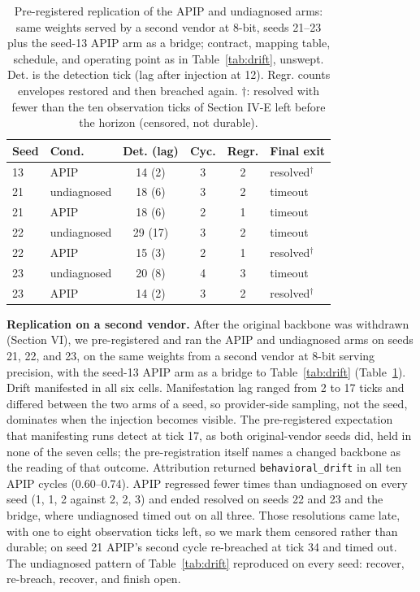\documentclass[conference]{IEEEtran}
\begin{document}
\begin{table}[!t]
\caption{Pre-registered replication of the APIP and undiagnosed arms: same weights served by a second vendor at 8-bit, seeds 21--23 plus the seed-13 APIP arm as a bridge; contract, mapping table, schedule, and operating point as in Table~\ref{tab:drift}, unswept. Det. is the detection tick (lag after injection at 12). Regr. counts envelopes restored and then breached again. $\dagger$: resolved with fewer than the ten observation ticks of Section IV-E left before the horizon (censored, not durable).}
\label{tab:repl}
\centering
\footnotesize
\begin{tabular}{llcccl}
\hline
Seed & Cond. & Det. (lag) & Cyc. & Regr. & Final exit \\
\hline
13 & APIP & 14 (2) & 3 & 2 & resolved$^\dagger$ \\
21 & undiagnosed & 18 (6) & 3 & 2 & timeout \\
21 & APIP & 18 (6) & 2 & 1 & timeout \\
22 & undiagnosed & 29 (17) & 3 & 2 & timeout \\
22 & APIP & 15 (3) & 2 & 1 & resolved$^\dagger$ \\
23 & undiagnosed & 20 (8) & 4 & 3 & timeout \\
23 & APIP & 14 (2) & 3 & 2 & resolved$^\dagger$ \\
\hline
\end{tabular}
\end{table}

\textbf{Replication on a second vendor.} After the original backbone was withdrawn (Section VI), we pre-registered and ran the APIP and undiagnosed arms on seeds 21, 22, and 23, on the same weights from a second vendor at 8-bit serving precision, with the seed-13 APIP arm as a bridge to Table~\ref{tab:drift} (Table~\ref{tab:repl}). Drift manifested in all six cells. Manifestation lag ranged from 2 to 17 ticks and differed between the two arms of a seed, so provider-side sampling, not the seed, dominates when the injection becomes visible. The pre-registered expectation that manifesting runs detect at tick 17, as both original-vendor seeds did, held in none of the seven cells; the pre-registration itself names a changed backbone as the reading of that outcome. Attribution returned \texttt{behavioral\_drift} in all ten APIP cycles (0.60--0.74). APIP regressed fewer times than undiagnosed on every seed (1, 1, 2 against 2, 2, 3) and ended resolved on seeds 22 and 23 and the bridge, where undiagnosed timed out on all three. Those resolutions came late, with one to eight observation ticks left, so we mark them censored rather than durable; on seed 21 APIP's second cycle re-breached at tick 34 and timed out. The undiagnosed pattern of Table~\ref{tab:drift} reproduced on every seed: recover, re-breach, recover, and finish open.
\end{document}
